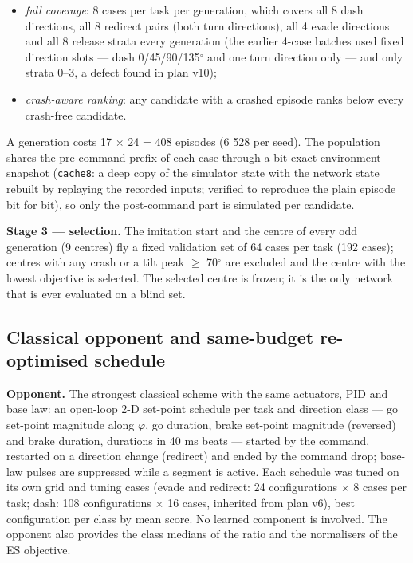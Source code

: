 \documentclass[10pt,a4paper]{article}
\begin{document}
\begin{itemize}\setlength\itemsep{2pt}
\item \emph{full coverage}: 8 cases per task per generation, which covers all 8 dash directions, all 8 redirect pairs (both turn directions), all 4 evade directions and all 8 release strata every generation (the earlier 4-case batches used fixed direction slots --- dash 0/45/90/135$^\circ$ and one turn direction only --- and only strata 0--3, a defect found in plan v10);
\item \emph{crash-aware ranking}: any candidate with a crashed episode ranks below every crash-free candidate.
\end{itemize}

A generation costs 17 $\times$ 24 = 408 episodes (6 528 per seed). The population shares the pre-command prefix of each case through a bit-exact environment snapshot (\texttt{cache8}: a deep copy of the simulator state with the network state rebuilt by replaying the recorded inputs; verified to reproduce the plain episode bit for bit), so only the post-command part is simulated per candidate.

\textbf{Stage 3 --- selection.} The imitation start and the centre of every odd generation (9 centres) fly a fixed validation set of 64 cases per task (192 cases); centres with any crash or a tilt peak $\ge$ 70$^\circ$ are excluded and the centre with the lowest objective is selected. The selected centre is frozen; it is the only network that is ever evaluated on a blind set.

\subsection{Classical opponent and same-budget re-optimised schedule}

\textbf{Opponent.} The strongest classical scheme with the same actuators, PID and base law: an open-loop 2-D set-point schedule per task and direction class --- go set-point magnitude along $\varphi$, go duration, brake set-point magnitude (reversed) and brake duration, durations in 40 ms beats --- started by the command, restarted on a direction change (redirect) and ended by the command drop; base-law pulses are suppressed while a segment is active. Each schedule was tuned on its own grid and tuning cases (evade and redirect: 24 configurations $\times$ 8 cases per task; dash: 108 configurations $\times$ 16 cases, inherited from plan v6), best configuration per class by mean score. No learned component is involved. The opponent also provides the class medians of the ratio and the normalisers of the ES objective.
\end{document}
